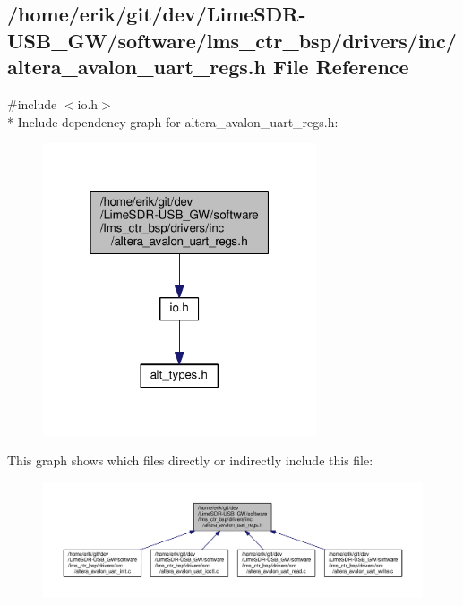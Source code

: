 \subsection{/home/erik/git/dev/\+Lime\+S\+D\+R-\/\+U\+S\+B\+\_\+\+G\+W/software/lms\+\_\+ctr\+\_\+bsp/drivers/inc/altera\+\_\+avalon\+\_\+uart\+\_\+regs.h File Reference}
\label{altera__avalon__uart__regs_8h}
{\ttfamily \#include $<$io.\+h$>$}\\*
Include dependency graph for altera\+\_\+avalon\+\_\+uart\+\_\+regs.\+h\+:
\nopagebreak
\begin{figure}[H]
\begin{center}
\leavevmode
\includegraphics[width=229pt]{d7/d65/altera__avalon__uart__regs_8h__incl}
\end{center}
\end{figure}
This graph shows which files directly or indirectly include this file\+:
\nopagebreak
\begin{figure}[H]
\begin{center}
\leavevmode
\includegraphics[width=350pt]{da/dc0/altera__avalon__uart__regs_8h__dep__incl}
\end{center}
\end{figure}
